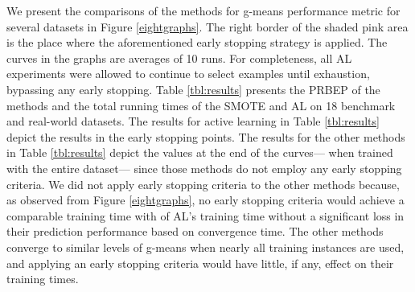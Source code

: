 We present the comparisons of the methods for g-means performance metric for several datasets in Figure \ref{eightgraphs}. The right border of the shaded pink area is the place where the aforementioned early stopping strategy is applied.  The curves in the graphs are averages of 10 runs. For completeness, all  AL experiments were allowed to continue to select examples until exhaustion, bypassing any early stopping.  Table \ref{tbl:results} presents the PRBEP of the methods and the total running times of the SMOTE and AL on 18 benchmark and real-world datasets. The results for active learning in Table \ref{tbl:results} depict the results in the early stopping points. The results for the other methods in Table \ref{tbl:results} depict the values at the end of the curves--- when trained with the entire dataset--- since those methods do not employ any early stopping criteria. We did not apply early stopping criteria to the other methods because, as observed from Figure \ref{eightgraphs}, no early stopping criteria would achieve a comparable training time with of AL's training time without a significant loss in their prediction performance based on convergence time. The other methods converge to similar levels of g-means when nearly all training instances are used, and applying an early stopping criteria would have little, if any, effect on their training times.

